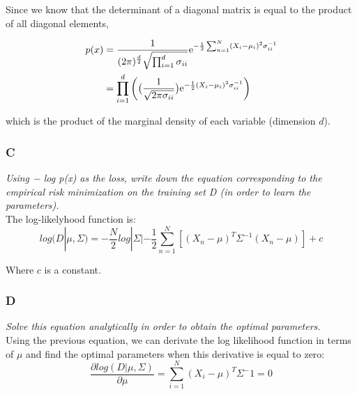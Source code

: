 \documentclass{amsart}
\theoremstyle{definition}
\theoremstyle{remark}
\numberwithin{equation}{section}
\begin{document}
Since we know that the determinant of a diagonal matrix is equal to the product 
of all diagonal elements, 

\begin{equation}
    \begin{align}
    p(x) & = \frac{1}{(2\pi)^{\frac{d}{2}} \sqrt{\prod_{i=1}^{d}\sigma_{ii}}} {\rm e}^{-\frac{1}{2}\sum_{n=1}^{N}(X_i-\mu_i)^2 \sigma_{ii}^{-1}} \\
         & = \prod_{i=1}^{d} \bigg(\big(\frac{1}{\sqrt{2\pi \sigma_{ii}}} \big) {\rm e}^{-\frac{1}{2}(X_i-\mu_i)^2 \sigma_{ii}^{-1}}\bigg)
    \end{align}
\end{equation}

which is the product of the marginal density of each variable (dimension $d$).

\subsubsection{C}

\textit{Using − log p(x) as the loss, write down the equation corresponding 
        to the empirical risk minimization on the training set D (in order to 
        learn the parameters).} \\

The log-likelyhood function is: \\

\begin{equation}
    log(D|\mu,\Sigma) = -\frac{N}{2}log|\Sigma| -\frac{1}{2} 
        \sum_{n=1}^{N} [(X_n - \mu)^T \Sigma^{-1} (X_n - \mu)] + c
\end{equation}

Where $c$ is a constant. \\

\subsubsection{D}

\textit{Solve this equation analytically in order to obtain the optimal
            parameters.} \\

Using the previous equation, we can derivate the log likelihood function in terms of 
$\mu$ and find the optimal parameters when this derivative is equal to zero: \\

\begin{equation}
    \frac{\partial log (D | \mu, \Sigma)}{\partial\mu} = 
        \sum_{i=1}^{N}(X_i-\mu)^T \Sigma^-1 = 0 
\end{equation}
\end{document}
